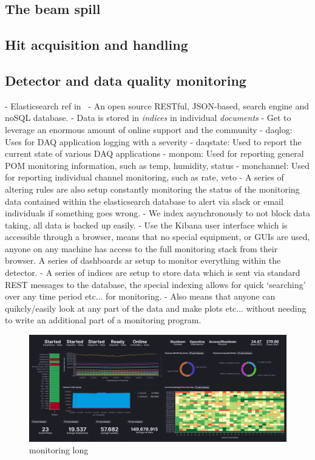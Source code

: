 \subsection{The beam spill} %
\label{sec:daq_soft_spill} %

\subsection{Hit acquisition and handling} %
\label{sec:daq_soft_hits} %

\subsection{Detector and data quality monitoring} %
\label{sec:daq_soft_monitor} %

- Elasticsearch ref in~\cite{elastic2020}
- An open source RESTful, JSON-based, search engine and noSQL database.
- Data is stored in \emph{indices} in individual \emph{documents}
- Get to leverage an enormous amount of online support and the community
- daqlog: Uses for DAQ application logging with a severity
- daqstate: Used to report the current state of various DAQ applications
- monpom: Used for reporting general POM monitoring information, such as temp, humidity, status
- monchannel: Used for reporting individual channel monitoring, such as rate, veto
- A series of altering rules are also setup constantly monitoring the status of the monitoring
data contained within the elasticsearch database to alert via slack or email individuals if something goes wrong.
- We index asynchronously to not block data taking, all data is backed up easily.
- Use the Kibana user interface which is accessible through a browser, means that no special
equipment, or GUIs are used, anyone on any machine has access to the full monitoring stack from
their browser. A series of dashboards ar setup to monitor everything within the detector.
- A series of indices are setup to store data which is sent via standard REST messages to the
database, the special indexing allows for quick `searching' over any time period etc... for
monitoring.
- Also means that anyone can quikcly/easily look at any part of the data and make plots etc...
without needing to write an additional part of a monitoring program.


\begin{figure} %
    \includegraphics[width=\textwidth]{diagrams/5-daq/monitoring.png}
    \caption[monitoring short]
    {monitoring long}
    \label{fig:monitoring}
\end{figure}